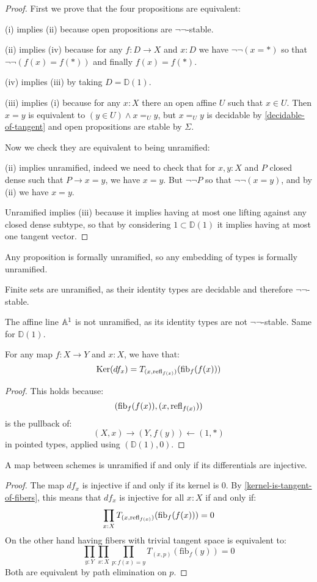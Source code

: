 \begin{proof}
First we prove that the four propositions are equivalent:

(i) implies (ii) because open propositions are $\neg\neg$-stable.

(ii) implies (iv) because for any $f:D\to X$ and $x:D$ we have $\neg\neg(x=*)$ so that $\neg\neg(f(x)=f(*))$ and finally $f(x)=f(*)$.

(iv) implies (iii) by taking $D=\mathbb{D}(1)$.

(iii) implies (i) because for any $x:X$ there an open affine $U$ such that $x\in U$. Then $x=y$ is equivalent to $(y\in U)\land x=_U y$, but $x=_Uy$ is decidable by \cref{decidable-of-tangent} and open propositions are stable by $\Sigma$.

Now we check they are equivalent to being unramified:

(ii) implies unramified, indeed we need to check that for $x,y:X$ and $P$ closed dense such that $P\to x=y$, we have $x=y$. But $\neg\neg P$ so that $\neg\neg(x=y)$, and by (ii) we have $x=y$.

Unramified implies (iii) because it implies having at most one lifting against any closed dense subtype, so that by considering $1\subset \mathbb{D}(1)$ it implies having at most one tangent vector.
\end{proof}

\begin{example}
Any proposition is formally unramified, so any embedding of types is formally unramified.

Finite sets are unramified, as their identity types are decidable and therefore $\neg\neg$-stable.

The affine line $\mathbb{A}^1$ is not unramified, as its identity types are not $\neg\neg$-stable. Same for $\mathbb{D}(1)$.
\end{example}

\begin{lemma}
\label{kernel-is-tangent-of-fibers}
For any map $f:X\to Y$ and $x:X$, we have that:
\[
\mathrm{Ker}(df_x) = T_{(x,\mathrm{refl}_{f(x)})}(\mathrm{fib}_f(f(x)))
\]
\end{lemma}
\begin{proof}
This holds because:
\[
(\mathrm{fib}_f(f(x)),(x,\mathrm{refl}_{f(x)}))
\]
is the pullback of:
\[
(X,x) \to (Y,f(y)) \leftarrow (1,*)
\]
in pointed types, applied using $(\mathbb{D}(1),0)$.
\end{proof}

\begin{proposition}
A map between schemes is unramified if and only if its differentials are injective. 
\end{proposition}
\begin{proof}
The map $df_x$ is injective if and only if its kernel is $0$. By \cref{kernel-is-tangent-of-fibers}, this means that $df_x$ is injective for all $x:X$ if and only if:
\[
\prod_{x:X}T_{(x,\mathrm{refl}_{f(x)})}(\mathrm{fib}_f(f(x)))=0
\]
On the other hand having fibers with trivial tangent space is equivalent to:
\[
\prod_{y:Y}\prod_{x:X}\prod_{p:f(x)=y} T_{(x,p)}(\mathrm{fib}_f(y)) = 0
\]
Both are equivalent by path elimination on $p$.
\end{proof}

